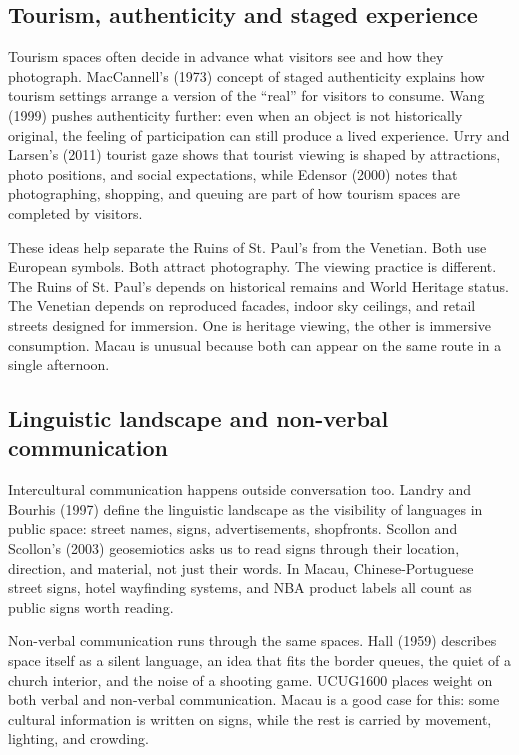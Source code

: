 \documentclass[12pt,a4paper]{article}
\begin{document}
\subsection{Tourism, authenticity and staged experience}

Tourism spaces often decide in advance what visitors see and how they photograph. MacCannell's (1973) concept of staged authenticity explains how tourism settings arrange a version of the ``real'' for visitors to consume. Wang (1999) pushes authenticity further: even when an object is not historically original, the feeling of participation can still produce a lived experience. Urry and Larsen's (2011) tourist gaze shows that tourist viewing is shaped by attractions, photo positions, and social expectations, while Edensor (2000) notes that photographing, shopping, and queuing are part of how tourism spaces are completed by visitors.

These ideas help separate the Ruins of St. Paul's from the Venetian. Both use European symbols. Both attract photography. The viewing practice is different. The Ruins of St. Paul's depends on historical remains and World Heritage status. The Venetian depends on reproduced facades, indoor sky ceilings, and retail streets designed for immersion. One is heritage viewing, the other is immersive consumption. Macau is unusual because both can appear on the same route in a single afternoon.

\subsection{Linguistic landscape and non-verbal communication}

Intercultural communication happens outside conversation too. Landry and Bourhis (1997) define the linguistic landscape as the visibility of languages in public space: street names, signs, advertisements, shopfronts. Scollon and Scollon's (2003) geosemiotics asks us to read signs through their location, direction, and material, not just their words. In Macau, Chinese-Portuguese street signs, hotel wayfinding systems, and NBA product labels all count as public signs worth reading.

Non-verbal communication runs through the same spaces. Hall (1959) describes space itself as a silent language, an idea that fits the border queues, the quiet of a church interior, and the noise of a shooting game. UCUG1600 places weight on both verbal and non-verbal communication. Macau is a good case for this: some cultural information is written on signs, while the rest is carried by movement, lighting, and crowding.
\end{document}
